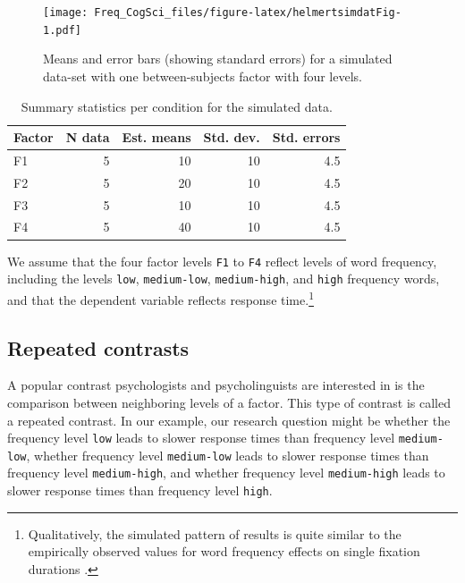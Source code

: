\documentclass[
  12pt,
]{krantz}
\theoremstyle{definition}
\theoremstyle{definition}
\theoremstyle{definition}
\theoremstyle{definition}
\theoremstyle{remark}
\begin{document}
\begin{figure}
\centering
\texttt{[image: Freq\_CogSci\_files/figure-latex/helmertsimdatFig-1.pdf]}
\caption{\label{fig:helmertsimdatFig}Means and error bars (showing standard errors) for a simulated data-set with one between-subjects factor with four levels.}
\end{figure}

\begin{table}[b]

\caption{\label{tab:cTab3Means}Summary statistics per condition for the simulated data.}
\centering
\begin{tabular}[t]{l|r|r|r|r}
\hline
Factor & N data & Est. means & Std. dev. & Std. errors\\
\hline
F1 & 5 & 10 & 10 & 4.5\\
\hline
F2 & 5 & 20 & 10 & 4.5\\
\hline
F3 & 5 & 10 & 10 & 4.5\\
\hline
F4 & 5 & 40 & 10 & 4.5\\
\hline
\end{tabular}
\end{table}

We assume that the four factor levels \texttt{F1} to \texttt{F4} reflect levels of word frequency, including the levels \texttt{low}, \texttt{medium-low}, \texttt{medium-high}, and \texttt{high} frequency words, and that the dependent variable reflects response time.\footnote{Qualitatively, the simulated pattern of results is quite similar to the empirically observed values for word frequency effects on single fixation durations \citep{heister2012analysing}.}

\hypertarget{repeatedcontrasts}{%
\subsection{Repeated contrasts}\label{repeatedcontrasts}}

A popular contrast psychologists and psycholinguists are interested in is the comparison between neighboring levels of a factor. This type of contrast is called a repeated contrast. In our example, our research question might be whether the frequency level \texttt{low} leads to slower response times than frequency level \texttt{medium-low}, whether frequency level \texttt{medium-low} leads to slower response times than frequency level \texttt{medium-high}, and whether frequency level \texttt{medium-high} leads to slower response times than frequency level \texttt{high}.
\end{document}
